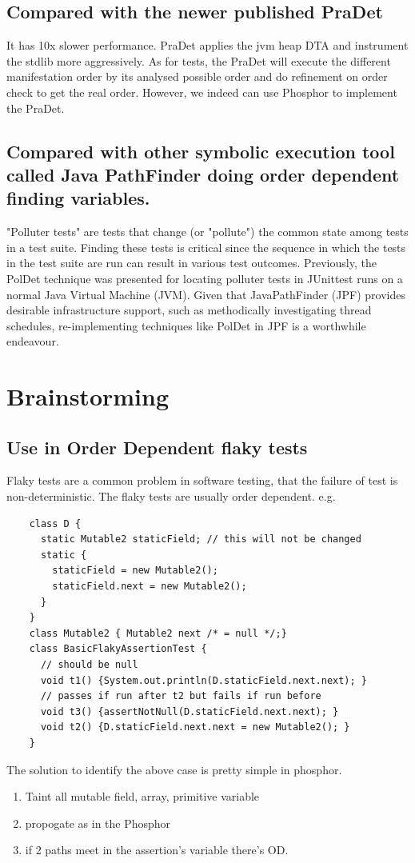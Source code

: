 \documentclass[conference]{IEEEtran}
\begin{document}
\subsection{Compared with the newer published PraDet \cite{b8}} It has 10x slower performance. PraDet applies the jvm heap DTA and instrument the stdlib more aggressively. As for tests, the PraDet will execute the different manifestation order by its analysed possible order and do refinement on order check to get the real order. However, we indeed can use Phosphor to implement the PraDet.


\subsection{Compared with other symbolic execution tool called Java PathFinder doing order dependent finding variables.}
"Polluter tests" are tests that change (or "pollute") the common state among tests in a test suite. Finding these tests is critical since the sequence in which the tests in the test suite are run can result in various test outcomes. Previously, the PolDet technique was presented for locating polluter tests in JUnittest runs on a normal Java Virtual Machine (JVM). Given that JavaPathFinder (JPF) provides desirable infrastructure support, such as methodically investigating thread schedules, re-implementing techniques like PolDet in JPF is a worthwhile endeavour. \cite{b4} 

\section{Brainstorming}

\subsection{Use in Order Dependent flaky tests}
Flaky tests are a common problem in software testing, that the failure of test is non-deterministic. The flaky tests are usually order dependent. e.g.
\begin{verbatim}
    class D {
      static Mutable2 staticField; // this will not be changed
      static {
        staticField = new Mutable2();
        staticField.next = new Mutable2();
      }
    }
    class Mutable2 { Mutable2 next /* = null */;}
    class BasicFlakyAssertionTest {
      // should be null
      void t1() {System.out.println(D.staticField.next.next); }
      // passes if run after t2 but fails if run before
      void t3() {assertNotNull(D.staticField.next.next); }
      void t2() {D.staticField.next.next = new Mutable2(); }
    }
    \end{verbatim}
The solution to identify the above case is pretty simple in phosphor.
\begin{enumerate}
\item Taint all mutable field, array, primitive variable
\item propogate as in the Phosphor
\item if 2 paths meet in the assertion's variable there's OD.
\end{enumerate}
\end{document}
